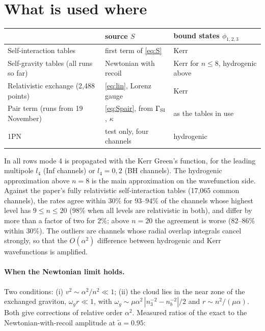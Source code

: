 \documentclass[11pt]{article}
\begin{document}
\section{What is used where}

\begin{center}
\begin{tabular}{@{}lll@{}}
\toprule
 & source $S$ & bound states $\phi_{1,2,3}$ \\
\midrule
Self-interaction tables & first term of \eqref{eq:S} & Kerr \\
Self-gravity tables (all runs so far) & Newtonian with recoil & Kerr for $n\le8$, hydrogenic above \\
Relativistic exchange (2{,}488 points) & \eqref{eq:lin}, Lorenz gauge & Kerr \\
Pair term (runs from 19 November) & \eqref{eq:Spair}, from $\Gamma_{\rm SI}$, $\kappa$ & as the tables in use \\
1PN & test only, four channels & hydrogenic \\
\bottomrule
\end{tabular}
\end{center}
In all rows mode 4 is propagated with the Kerr Green's function, for the leading multipole $l_4$ (Inf channels) or $l_4=0,2$ (BH channels).
The hydrogenic approximation above $n=8$ is the main approximation on the wavefunction side. Against the paper's fully relativistic
self-interaction tables (17,065 common channels), the rates agree within $30\%$ for $93$--$94\%$ of the channels whose highest level has
$9\le n\le20$ ($98\%$ when all levels are relativistic in both), and differ by more than a factor of two for $2\%$; above $n=20$ the
agreement is worse ($82$--$86\%$ within $30\%$). The outliers are channels whose radial overlap integrals cancel strongly, so that
the $O(\alpha^2)$ difference between hydrogenic and Kerr wavefunctions is amplified.

\paragraph{When the Newtonian limit holds.} Two conditions: (i) $v^2\sim\alpha^2/n^2\ll1$; (ii) the cloud lies in the near zone of the
exchanged graviton, $\omega_gr\ll1$, with $\omega_g\sim\mu\alpha^2\,|n_3^{-2}-n_b^{-2}|/2$ and $r\sim n^2/(\mu\alpha)$. Both give corrections of
relative order $\alpha^2$. Measured ratios of the exact to the Newtonian-with-recoil amplitude at $\tilde a=0.95$:
\end{document}
